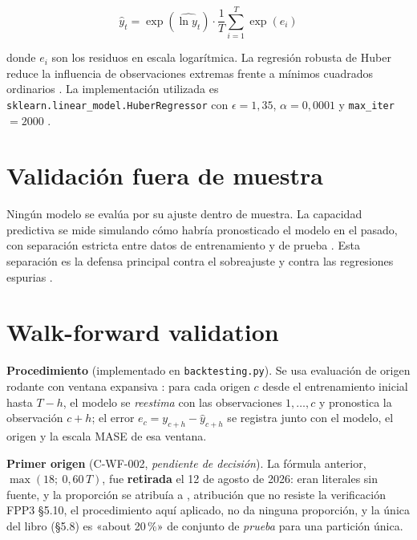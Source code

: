 \documentclass[12pt]{article}
\begin{document}
\begin{equation}
\hat{y}_t = \exp(\widehat{\ln y_t}) \cdot \frac{1}{T}\sum_{i=1}^{T} \exp(e_i)
\label{eq:smearing}
\end{equation}

donde $e_i$ son los residuos en escala logar\'itmica. La regresi\'on robusta de Huber reduce la influencia de observaciones extremas frente a m\'inimos cuadrados ordinarios \citep{huber1964,penn_state_robust_regression}. La implementaci\'on utilizada es \texttt{sklearn.linear\_model.HuberRegressor} con $\epsilon=1{,}35$, $\alpha=0{,}0001$ y \texttt{max\_iter}$=2000$ \citep{sklearn_huberregressor}.

\section{Validaci\'on fuera de muestra}
\label{sec:oos}

Ning\'un modelo se eval\'ua por su ajuste dentro de muestra. La capacidad predictiva se mide simulando c\'omo habr\'ia pronosticado el modelo en el pasado, con separaci\'on estricta entre datos de entrenamiento y de prueba \citep{tashman2000,hyndman2021fpp3}. Esta separaci\'on es la defensa principal contra el sobreajuste y contra las regresiones espurias \citep{granger_newbold1974}.

\section{Walk-forward validation}
\label{sec:wf}

\textbf{Procedimiento} (implementado en \texttt{backtesting.py}). Se usa evaluaci\'on de origen rodante con ventana expansiva \citep{tashman2000,hyndman_tscv_2021,skforecast_backtesting_2026}: para cada origen $c$ desde el entrenamiento inicial hasta $T-h$, el modelo se \emph{reestima} con las observaciones $1,\dots,c$ y pronostica la observaci\'on $c+h$; el error $e_c = y_{c+h} - \hat{y}_{c+h}$ se registra junto con el modelo, el origen y la escala MASE de esa ventana.

\textbf{Primer origen} (C-WF-002, \emph{pendiente de decisi\'on}). La f\'ormula anterior, $\max(18;\ 0{,}60\,T)$, fue \textbf{retirada} el 12 de agosto de 2026: eran literales sin fuente, y la proporci\'on se atribu\'ia a \citet{hyndman2021fpp3}, atribuci\'on que no resiste la verificaci\'on \textemdash{}FPP3 \S5.10, el procedimiento aqu\'i aplicado, no da ninguna proporci\'on, y la \'unica del libro (\S5.8) es «about 20\,\%» de conjunto de \emph{prueba} para una partici\'on \'unica.
\end{document}
